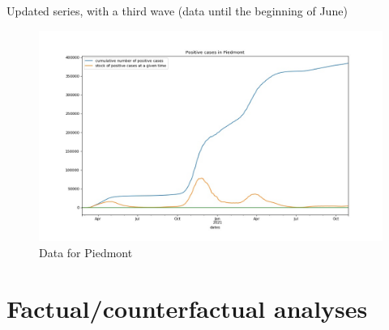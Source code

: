 \documentclass[9pt]{beamer}
\begin{document}
\begin{frame}{Updated series, with a third wave (data until the beginning of June)}

\begin{figure}[H]
\center
\includegraphics[scale=0.35]{andamento900AA.jpg}
\caption{Data for Piedmont} 
\label{dataP}
\end{figure}


\end{frame}




\section{Factual/counterfactual analyses}
\end{document}
